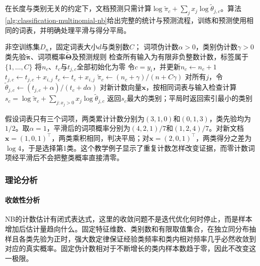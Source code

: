 在长度与类别无关的约定下，文档预测只需计算$\log\tilde\pi_c+\sum_jx_j\log\tilde\theta_{j,c}$。算法\ref{alg:classification-multinomial-nb}给出完整的统计与预测流程，训练和预测使用相同的词表，并明确处理平滑与得分平局。
\begin{algorithm}[带平滑的多项式朴素贝叶斯]
  \label{alg:classification-multinomial-nb}
  \begin{algorithmic}[1]
    \Require 非空训练集$D_n$，固定词表大小$d$与类别数$C$；
    \Statex \hspace{\algorithmicindent} 词项伪计数$\alpha>0$，类别伪计数$\gamma>0$
    \Ensure 类先验$\tilde{\bm{\pi}}$、词项概率$\tilde{\bm{\Theta}}$及预测规则
    \State 检查所有输入为有限非负整数计数，标签属于$\{1,\ldots,C\}$
    \State 将$n_c$、$t_c$与$t_{j,c}$全部初始化为零
      \State 令$c=y_i$，并更新$n_c\gets n_c+1$
        \State $t_{j,c}\gets t_{j,c}+x_{i,j}$
        \State $t_c\gets t_c+x_{i,j}$
      \EndFor
    \EndFor
      \State $\tilde\pi_c\gets(n_c+\gamma)/(n+C\gamma)$
      \State 对所有$j$，令$\tilde\theta_{j,c}\gets(t_{j,c}+\alpha)/(t_c+d\alpha)$
    \EndFor
    \State 对新计数向量$\bm{x}$，按相同词表与输入检查计算
    \Statex \hspace{\algorithmicindent}
      $s_c=\log\tilde\pi_c+\sum_{j:x_j>0}x_j\log\tilde\theta_{j,c}$
    \State 返回$s_c$最大的类别；平局时返回索引最小的类别
  \end{algorithmic}
\end{algorithm}

假设词表只有三个词项，两类累计计数分别为$(3,1,0)$和$(0,1,3)$，类先验均为$1/2$。取$\alpha=1$，平滑后的词项概率分别为$(4,2,1)/7$和$(1,2,4)/7$。对新文档$\bm{x}=(1,0,1)^{\top}$，两类乘积相同，判决平局；对$\bm{x}=(2,0,1)^{\top}$，两类得分之差为$\log4$，于是选择第1类。这个教学例子显示了重复计数怎样改变证据，而零计数词项经平滑后不会把整类概率直接清零。

\subsubsection{理论分析}
\label{sec:classification-naive-bayes-theory}

\paragraph{收敛性分析}
NB的计数估计有闭式表达式，这里的收敛问题不是迭代优化何时停止，而是样本增加后估计量趋向什么。固定特征维数、类别数和有限取值集合，在独立同分布抽样且各类先验为正时，强大数定律保证经验类频率和类内相对频率几乎必然收敛到对应的真实概率。固定伪计数相对于不断增长的类内样本数趋于零，因此不改变这一极限。

